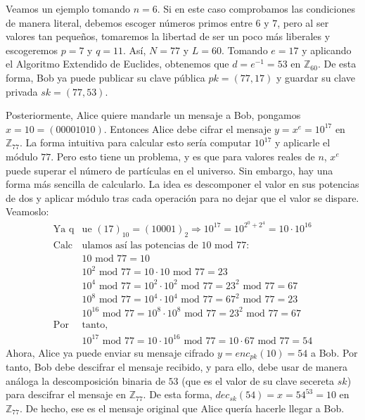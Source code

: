     \begin{ejemplo} \label{ej: 1.11}
        Veamos un ejemplo tomando $n = 6$. Si en este caso comprobamos las condiciones de manera literal, debemos escoger números primos entre $6$ y $7$, pero al ser valores tan pequeños, tomaremos la libertad de ser un poco más liberales y escogeremos $p = 7$ y $q = 11$. Así, $N = 77$ y $L = 60$. Tomando $e = 17$ y aplicando el Algoritmo Extendido de Euclides, obtenemos que $d = e^{-1} = 53$ en $\mathbb{Z}_{60}$. De esta forma, Bob ya puede publicar su clave pública $pk = (77, 17)$ y guardar su clave privada $sk = (77, 53)$.

        Posteriormente, Alice quiere mandarle un mensaje a Bob, pongamos $x = 10 = (00001010)$. Entonces Alice debe cifrar el mensaje $y = x^{e} = 10^{17}$ en $\mathbb{Z}_{77}$. La forma intuitiva para calcular esto sería computar $10^{17}$ y aplicarle el módulo $77$. Pero esto tiene un problema, y es que para valores reales de $n$, $x^{e}$ puede superar el número de partículas en el universo. Sin embargo, hay una forma más sencilla de calcularlo. La idea es descomponer el valor en sus potencias de dos y aplicar módulo tras cada operación para no dejar que el valor se dispare. Veamoslo:
        \begin{align}
            \text{Ya q} & \text{ue }(17)_{10} = (10001)_{2} \Rightarrow 10^{17} = 10^{2^{0}+2^{4}} = 10 \cdot 10^{16} \\
            \text{Calc} & \text{ulamos} \text{ así las potencias de $10$ mod $77$:} \\
            &10 \text{ mod } 77 = 10 \\
            &10^{2} \text{ mod } 77 = 10 \cdot 10 \text{ mod } 77 = 23 \\
            &10^{4} \text{ mod } 77 = 10^{2} \cdot 10^{2} \text{ mod } 77 = 23^{2} \text{ mod } 77 = 67 \\
            &10^{8} \text{ mod } 77 = 10^{4} \cdot 10^{4} \text{ mod } 77 = 67^{2} \text{ mod } 77 = 23 \\
            &10^{16} \text{ mod } 77 = 10^{8} \cdot 10^{8} \text{ mod } 77 = 23^{2} \text{ mod } 77 = 67 \\
            \text{Por } & \text{tanto,} \\
            &10^{17} \text{ mod } 77 = 10 \cdot 10^{16} \text{ mod } 77 = 10 \cdot 67 \text{ mod } 77 = 54
        \end{align}
        Ahora, Alice ya puede enviar su mensaje cifrado $y = enc_{pk}(10) = 54$ a Bob. Por tanto, Bob debe descifrar el mensaje recibido, y para ello, debe usar de manera análoga la descomposición binaria de $53$ (que es el valor de su clave secereta $sk$) para descifrar el mensaje en $\mathbb{Z}_{77}$. De esta forma, $dec_{sk}(54) = x = 54^{53} = 10$ en $\mathbb{Z}_{77}$. De hecho, ese es el mensaje original que Alice quería hacerle llegar a Bob.
    \end{ejemplo}
    
